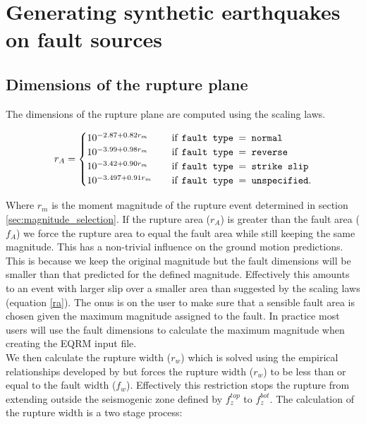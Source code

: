 \section{Generating synthetic earthquakes on fault sources}
\label{sec:fault_gen}

\subsection{Dimensions of the rupture plane}
\label{sec:rup_dimn}

The dimensions of the rupture plane are computed using the \citet{eqrm_Wells94} scaling laws. 

\begin{equation} \label{ra}
r_A = 
\begin{cases}
10^{-2.87 + 0.82r_m}	& \quad \mbox{if \texttt{fault type $=$  normal}} \\
10^{-3.99 + 0.98r_m}	& \quad \mbox{if \texttt{fault type $=$  reverse}} \\
10^{-3.42 + 0.90r_m}	& \quad \mbox{if \texttt{fault type $=$  strike slip}} \\
10^{-3.497 + 0.91r_m}	& \quad \mbox{if \texttt{fault type $=$  unspecified}} . \\
\end{cases}
\end{equation}

Where $r_m$ is the moment magnitude of the rupture event determined in section \ref{sec:magnitude_selection}. If the rupture area ($r_A$) is greater than the fault area ($f_A$) 
we force the rupture area to equal the fault area while still keeping the same magnitude. This has a non-trivial influence on the ground motion predictions.  
This is because we keep the original magnitude but the fault dimensions will be smaller than that predicted for the defined magnitude. Effectively this 
amounts to an event with larger slip over a smaller area
than suggested by the scaling laws (equation \ref{ra}). The onus is on the user to make sure that a sensible fault area is chosen given 
the maximum magnitude assigned to the fault. In practice most users will use the fault dimensions to calculate the maximum magnitude
when creating the EQRM input file. \\

We then calculate the rupture width ($r_w$) which is solved using the empirical relationships developed by \citet{eqrm_Wells94}  
but forces the rupture width ($r_w$) to be less than or equal to the fault width ($f_w$). Effectively this restriction stops the rupture from extending 
outside the seismogenic zone defined by $f_z^{top}$ to $f_z^{bot}$. The calculation of the rupture width is a two stage process:




